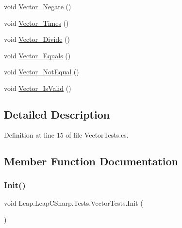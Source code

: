 \begin{DoxyCompactItemize}
\item 
void \mbox{\hyperlink{class_leap_1_1_leap_c_sharp_1_1_tests_1_1_vector_tests_a779aa5664557f4570619d0efb6ea7506}{Vector\+\_\+\+Negate}} ()
\item 
void \mbox{\hyperlink{class_leap_1_1_leap_c_sharp_1_1_tests_1_1_vector_tests_abc55df5efcb4ca9db145115f877662df}{Vector\+\_\+\+Times}} ()
\item 
void \mbox{\hyperlink{class_leap_1_1_leap_c_sharp_1_1_tests_1_1_vector_tests_abcfe9f53b45373c49e54555a1a29af5b}{Vector\+\_\+\+Divide}} ()
\item 
void \mbox{\hyperlink{class_leap_1_1_leap_c_sharp_1_1_tests_1_1_vector_tests_ad4a8f7fbb8f738bba7142e027446bcd5}{Vector\+\_\+\+Equals}} ()
\item 
void \mbox{\hyperlink{class_leap_1_1_leap_c_sharp_1_1_tests_1_1_vector_tests_afc10e5b06ee3c3f8f8c280c3ca7b11ae}{Vector\+\_\+\+Not\+Equal}} ()
\item 
void \mbox{\hyperlink{class_leap_1_1_leap_c_sharp_1_1_tests_1_1_vector_tests_a3d2ff59f317b5b2b3dd2bed12517cff9}{Vector\+\_\+\+Is\+Valid}} ()
\end{DoxyCompactItemize}


\subsection{Detailed Description}


Definition at line 15 of file Vector\+Tests.\+cs.



\subsection{Member Function Documentation}
\mbox{\label{class_leap_1_1_leap_c_sharp_1_1_tests_1_1_vector_tests_a0c48c6a5ba72b700beb775313918c769}} 
\subsubsection{\texorpdfstring{Init()}{Init()}}
{\footnotesize\ttfamily void Leap.\+Leap\+C\+Sharp.\+Tests.\+Vector\+Tests.\+Init (\begin{DoxyParamCaption}{ }\end{DoxyParamCaption})}



